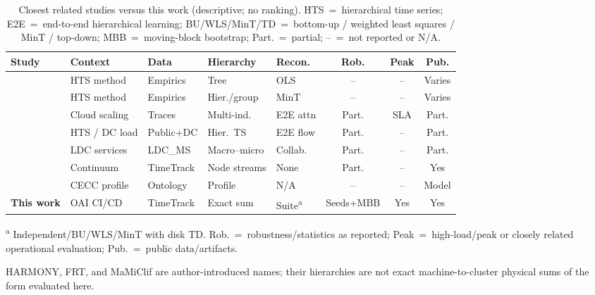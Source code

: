 \begin{table}[width=\textwidth,pos=t]
\centering
\caption{Closest related studies versus this work (descriptive; no ranking).
HTS~=~hierarchical time series; E2E~=~end-to-end hierarchical learning;
BU/{WLS}/MinT/{TD}~=~bottom-up / weighted least squares / MinT / top-down;
MBB~=~moving-block bootstrap; Part.~=~partial; --~=~not reported or N/A.}
\label{tab:related}
\begin{threeparttable}
\small
\setlength{\tabcolsep}{2.8pt}
\begin{tabularx}{\tblwidth}{@{}>{\raggedright\arraybackslash}p{1.85cm}>{\raggedright\arraybackslash}X>{\raggedright\arraybackslash}X>{\raggedright\arraybackslash}X>{\raggedright\arraybackslash}Xccc@{}}
\toprule
Study & Context & Data & Hierarchy & Recon. & Rob. & Peak & Pub. \\
\midrule
\cite{hyndman2011optimal} & HTS method & Empirics & Tree & OLS & -- & -- & Varies \\
\cite{wickramasuriya2019mint} & HTS method & Empirics & Hier./group & MinT & -- & -- & Varies \\
\cite{harmony2024} & Cloud scaling & Traces & Multi-ind. & E2E attn & Part. & SLA & Part. \\
\cite{wang2025frt} & HTS / DC load & Public+DC & Hier.\ TS & E2E flow & Part. & -- & Part. \\
\cite{gao2026mamiclif} & LDC services & LDC\_MS & Macro--micro & Collab. & Part. & -- & Part. \\
\cite{meliani2026zerotouch} & Continuum & TimeTrack & Node streams & None & Part. & -- & Yes \\
\cite{kadouma2025unifiedprofile} & CECC profile & Ontology & Profile & N/A & -- & -- & Model \\
\textbf{This work} & OAI CI/CD & TimeTrack & Exact sum & Suite\textsuperscript{a} & Seeds+MBB & Yes & Yes \\
\bottomrule
\end{tabularx}
\begin{tablenotes}
\footnotesize
\item\textsuperscript{a} Independent/BU/{WLS}/MinT with disk {TD}.
Rob.~=~robustness/statistics as reported; Peak~=~high-load/peak or closely
related operational evaluation; Pub.~=~public data/artifacts.
\item {HARMONY}, {FRT}, and {MaMiClif} are author-introduced names; their
hierarchies are not exact machine-to-cluster physical sums of the form evaluated
here.
\end{tablenotes}
\end{threeparttable}
\end{table}
